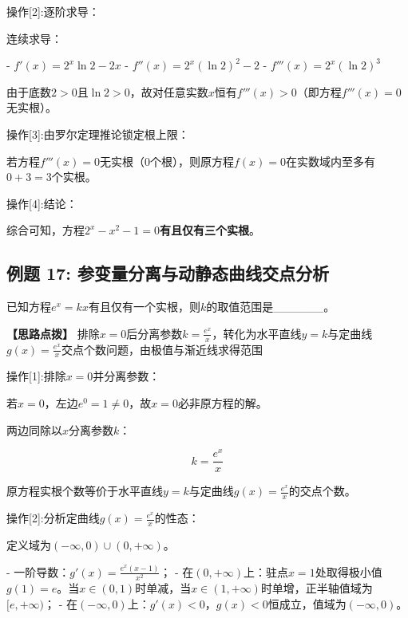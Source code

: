 \documentclass[11pt,a4paper,UTF8]{ctexart}
\begin{document}
操作[2]:逐阶求导：

\begin{solbox}[分步推导与答题规范]
连续求导：

- $f'(x) = 2^x \ln 2 - 2x$
- $f''(x) = 2^x (\ln 2)^2 - 2$
- $f'''(x) = 2^x (\ln 2)^3$

由于底数$2 > 0$且$\ln 2 > 0$，故对任意实数$x$恒有$f'''(x) > 0$（即方程$f'''(x) = 0$无实根）。
\end{solbox}

操作[3]:由罗尔定理推论锁定根上限：

\begin{solbox}[分步推导与答题规范]
若方程$f'''(x) = 0$无实根（0个根），则原方程$f(x) = 0$在实数域内至多有$0 + 3 = 3$个实根。
\end{solbox}

操作[4]:结论：

\begin{solbox}[分步推导与答题规范]
综合可知，方程$2^x - x^2 - 1 = 0$\textbf{有且仅有三个实根}。
\end{solbox}


\subsection{例题 17: 参变量分离与动静态曲线交点分析}

已知方程$e^x = kx$有且仅有一个实根，则$k$的取值范围是\_\_\_\_\_\_。

\textbf{\color{DeepPurple}【思路点拨】} 排除$x=0$后分离参数$k = \frac{e^x}{x}$，转化为水平直线$y = k$与定曲线$g(x) = \frac{e^x}{x}$交点个数问题，由极值与渐近线求得范围


操作[1]:排除$x = 0$并分离参数：

\begin{solbox}[分步推导与答题规范]
若$x = 0$，左边$e^0 = 1 \neq 0$，故$x = 0$必非原方程的解。

两边同除以$x$分离参数$k$：


\begin{equation*}
k = \frac{e^x}{x}
\end{equation*}


原方程实根个数等价于水平直线$y = k$与定曲线$g(x) = \frac{e^x}{x}$的交点个数。
\end{solbox}

操作[2]:分析定曲线$g(x) = \frac{e^x}{x}$的性态：

\begin{solbox}[分步推导与答题规范]
定义域为$(-\infty, 0) \cup (0, +\infty)$。

- 一阶导数：$g'(x) = \frac{e^x(x - 1)}{x^2}$；
- 在$(0, +\infty)$上：驻点$x = 1$处取得极小值$g(1) = e$。当$x \in (0, 1)$时单减，当$x \in (1, +\infty)$时单增，正半轴值域为$[e, +\infty)$；
- 在$(-\infty, 0)$上：$g'(x) < 0$，$g(x) < 0$恒成立，值域为$(-\infty, 0)$。
\end{solbox}
\end{document}
